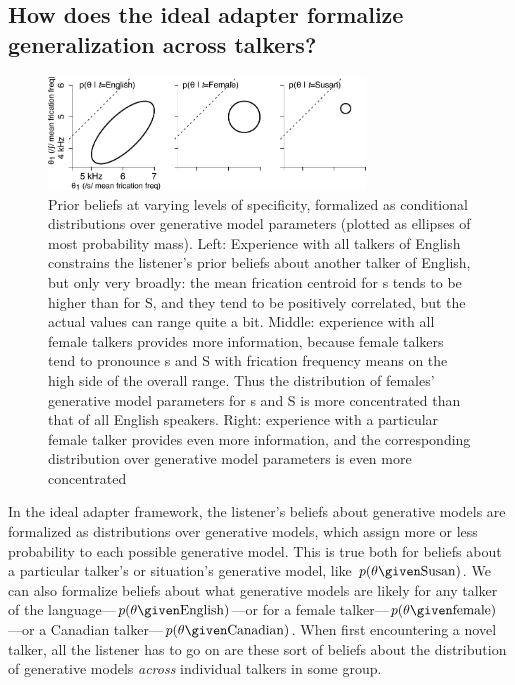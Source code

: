 \subsection{How does the ideal adapter formalize generalization across talkers?}
\label{sec:how-ideal-adapter-gen}

\begin{figure}[htb]
  \centering
\includegraphics[width=0.75\textwidth]{part2-schematics/english-male-talker-annotated.pdf}
  \caption{Prior beliefs at varying levels of specificity, formalized as conditional distributions over generative model parameters (plotted as ellipses of most probability mass).  Left: Experience with all talkers of English constrains the listener's prior beliefs about another talker of English, but only very broadly: the mean frication centroid for \ph s tends to be higher than for \ph S, and they tend to be positively correlated, but the actual values can range quite a bit. Middle: experience with all female talkers provides more information, because female talkers tend to pronounce \ph s and \ph S with frication frequency means on the high side of the overall range. Thus the distribution of females' generative model parameters for \ph s and \ph S is more concentrated than that of all English speakers. Right: experience with a particular female talker provides even more information, and the corresponding distribution over generative model parameters is even more concentrated}
  \label{fig:prior-beliefs-different-scales}
\end{figure}

In the ideal adapter framework, the listener's beliefs about generative models are formalized as distributions over generative models, which assign more or less probability to each possible generative model.  This is true both for beliefs about a particular talker's or situation's generative model, like $p(\theta \given \mathrm{Susan})$. We can also formalize beliefs about what generative models are likely for any talker of the language---$p(\theta \given \mathrm{English})$---or for a female talker---$p(\theta \given \mathrm{female})$---or a Canadian talker---$p(\theta \given \mathrm{Canadian})$.  When first encountering a novel talker, all the listener has to go on are these sort of beliefs about the distribution of generative models \emph{across} individual talkers in some group.  

